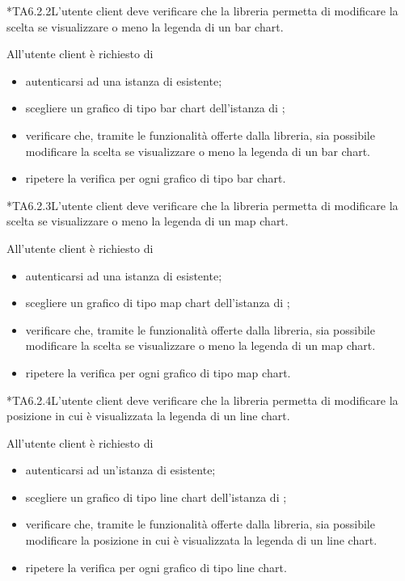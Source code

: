 	*{TA6.2.2}L'utente client deve verificare che la libreria permetta di modificare la scelta se visualizzare o meno la legenda di un bar chart.
		
		All'utente client è richiesto di
		\begin{itemize}
			\item autenticarsi ad una istanza di \projectname{} esistente;
			\item scegliere un grafico di tipo bar chart dell'istanza di \projectname{};
			\item verificare che, tramite le funzionalità offerte dalla libreria, sia possibile modificare la scelta se visualizzare o meno la legenda di un bar chart.
			\item ripetere la verifica per ogni grafico di tipo bar chart.
		\end{itemize}

	*{TA6.2.3}L'utente client deve verificare che la libreria permetta di modificare la scelta se visualizzare o meno la legenda di un map chart.
		
		All'utente client è richiesto di
		\begin{itemize}
			\item autenticarsi ad una istanza di \projectname{} esistente;
			\item scegliere un grafico di tipo map chart dell'istanza di \projectname{};
			\item verificare che, tramite le funzionalità offerte dalla libreria, sia possibile modificare la scelta se visualizzare o meno la legenda di un map chart.
			\item ripetere la verifica per ogni grafico di tipo map chart.
		\end{itemize}

	*{TA6.2.4}L'utente client deve verificare che la libreria permetta di modificare la posizione in cui è visualizzata la legenda di un line chart.
		
		All'utente client è richiesto di
		\begin{itemize}
			\item autenticarsi ad un'istanza di \projectname{} esistente;
			\item scegliere un grafico di tipo line chart dell'istanza di \projectname{};
			\item verificare che, tramite le funzionalità offerte dalla libreria, sia possibile modificare la posizione in cui è visualizzata la legenda di un line chart.
			\item ripetere la verifica per ogni grafico di tipo line chart.
		\end{itemize}

